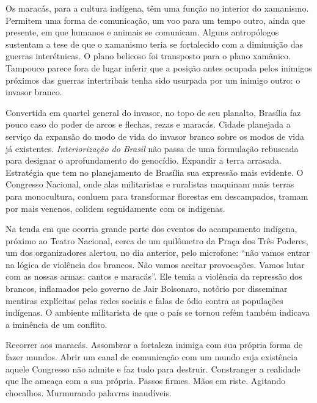 Os maracás, para a cultura indígena, têm uma função no interior do
xamanismo. Permitem uma forma de comunicação, um voo para um tempo
outro, ainda que presente, em que humanos e animais se comunicam. Alguns
antropólogos sustentam a tese de que o xamanismo teria se fortalecido
com a diminuição das guerras interétnicas. O plano belicoso foi
transposto para o plano xamânico. Tampouco parece fora de lugar inferir
que a posição antes ocupada pelos inimigos próximos das guerras
intertribais
tenha sido usurpada por um inimigo outro: o invasor branco.

Convertida em quartel general do invasor, no topo de seu planalto,
Brasília faz pouco caso do poder de arcos e flechas, rezas e maracás.
Cidade planejada a serviço da expansão do modo de vida do invasor branco
sobre os modos de vida já existentes. \emph{Interiorização do
Brasil} não passa de uma formulação rebuscada para designar o
aprofundamento do genocídio. Expandir a terra arrasada. Estratégia que
tem no planejamento de Brasília sua expressão mais evidente. O Congresso
Nacional, onde alas militaristas e ruralistas maquinam mais terras para
monocultura, conluem para transformar florestas em descampados, tramam
por mais venenos, colidem seguidamente com os indígenas.

Na tenda em que ocorria grande parte dos eventos do acampamento
indígena, próximo ao Teatro Nacional, cerca de um quilômetro da Praça
dos Três Poderes, um dos organizadores alertou, no dia anterior, pelo
microfone: ``não vamos entrar na lógica de violência dos brancos. Não
vamos aceitar provocações. Vamos lutar com as nossas armas: cantos e
maracás''. Ele temia a violência da repressão dos brancos, inflamados
pelo governo de Jair Bolsonaro, notório por disseminar mentiras
explícitas pelas redes sociais e falas de ódio contra as populações
indígenas. O ambiente militarista de que o país se tornou refém também
indicava a iminência de um conflito.

Recorrer aos maracás. Assombrar a fortaleza inimiga com sua própria
forma de fazer mundos. Abrir um canal de comunicação com um mundo cuja
existência aquele Congresso não admite e faz tudo para destruir. Constranger a realidade que lhe ameaça
com a sua própria. Passos firmes. Mãos em riste. Agitando chocalhos.
Murmurando palavras inaudíveis.

\pagebreak
\blankpage